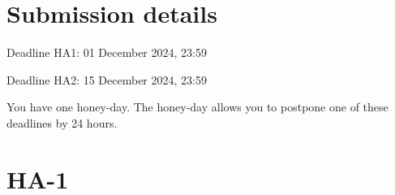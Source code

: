 \documentclass[12pt]{article}
\begin{document}
\section*{Submission details}


Deadline HA1: 01 December 2024, 23:59

Deadline HA2: 15 December 2024, 23:59

You have one honey-day. 
The honey-day allows you to postpone one of these deadlines by 24 hours. 

\newpage



\section{HA-1}
\end{document}
